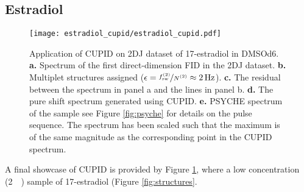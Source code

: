 \subsection{Estradiol}
\begin{figure}
    \texttt{[image: estradiol\_cupid/estradiol\_cupid.pdf]}%
    \caption[
        Application of \acs{CUPID} on a 17\textbeta-estradiol dataset.
    ]{
        Application of \acs{CUPID} on \ac{2DJ} dataset of 17\textbeta-estradiol
        in \acs{DMSOd6}.
        \textbf{a.} Spectrum of the first direct-dimension \ac{FID} in the
        \ac{2DJ} dataset.
        \textbf{b.} Multiplet structures assigned ($\epsilon =
        \nicefrac{f_{\mathrm{sw}}^{(2)}}{N^{(2)}} \approx \qty{2}{\hertz}$).
        \textbf{c.} The residual between the spectrum in panel a and the lines
        in panel b.
        \textbf{d.} The pure shift spectrum generated using \ac{CUPID}.
        \textbf{e.} \acs{PSYCHE} spectrum of the sample see Figure
        \ref{fig:psyche} for details on the pulse sequence. The spectrum has
        been scaled such that the maximum is of the same magnitude as the
        corresponding point in the \ac{CUPID} spectrum.
    }
    \label{fig:estradiol-cupid}%
\end{figure}

A final showcase of \ac{CUPID} is provided by Figure \ref{fig:estradiol-cupid}, where a low concentration (\qty{2}{\milli\molar}) sample of 17\textbeta-estradiol (Figure \ref{fig:structures}.
